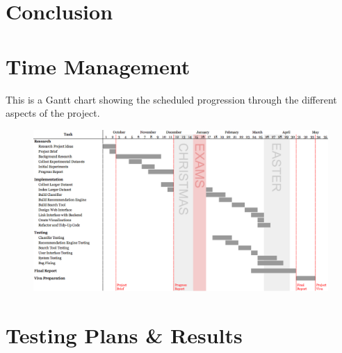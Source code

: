 \documentclass[11pt,a4paper]{report}
\begin{document}
\pagebreak

\chapter{Conclusion}
\label{chap:conclusion}

\pagebreak

\begin{appendices}
\chapter{Time Management}

\begin{landscape}
    \label{appendix:gantt}
    This is a Gantt chart showing the scheduled progression through the different aspects of the project.

    \begin{figure}[H]
        \centering
        \includegraphics[height=0.85\textwidth]{gantt.png}
    \end{figure}
\end{landscape}

\chapter{Testing Plans \& Results}


\end{appendices}
\end{document}
